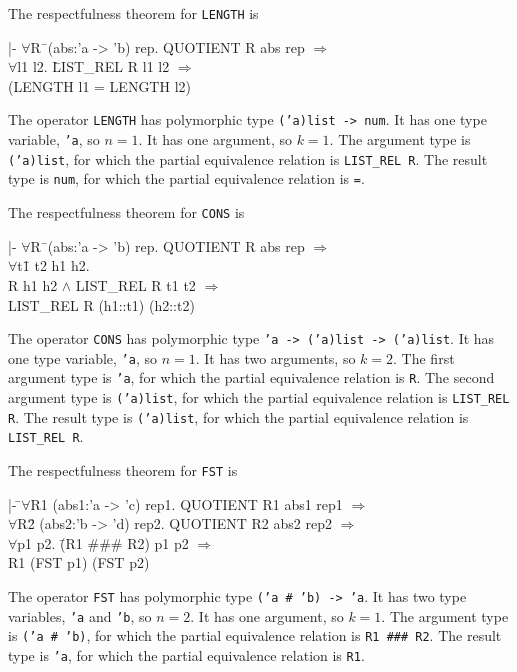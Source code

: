 \documentclass[envcountsame,runningheads]{llncs}
\newcommand{\quotient}{partial equivalence}
\begin{document}
\pagebreak[2]
The respectfulness theorem for {\tt LENGTH} is
{\tt \begin{tabbing}
\hspace{5.5mm}
    |- $\forall$R\=\ (abs:'a -> 'b) rep. QUOTIENT R abs rep $\Rightarrow$ \\
\>       $\forall$l1 l2. \=LIST\_REL R l1 l2 $\Rightarrow$ \\
\>\>             (LENGTH l1 = LENGTH l2)
\end{tabbing}}
The operator {\tt LENGTH} has polymorphic type {\tt ('a)list -> num}. 
It has one type variable, {\tt 'a}, so $n = 1$. 
It has one argument, so $k = 1$.
The argument type is
{\tt ('a)list},
for which
the \quotient{} relation
is {\tt LIST\_REL R}.
The result type is
{\tt num},
for which
the \quotient{} relation
is {\tt =}.

The respectfulness theorem for {\tt CONS} is
{\tt \begin{tabbing}
\hspace{5.5mm}
    |- $\forall$R\=\ (abs:'a -> 'b) rep. QUOTIENT R abs rep $\Rightarrow$ \\
\>       $\forall$t\=1 t2 h1 h2. \\
\>\>       R h1 h2 $\wedge$ LIST\_REL R t1 t2 $\Rightarrow$ \\
\>\>       LIST\_REL R (h1::t1) (h2::t2)
\end{tabbing}}
The operator {\tt CONS} has polymorphic type {\tt 'a -> ('a)list -> ('a)list}. 
It has one type variable, {\tt 'a}, so $n = 1$. 
It has two arguments, so $k = 2$.
The first argument type is
{\tt 'a},
for which
the \quotient{} relation
is {\tt R}.
The second argument type is
{\tt ('a)list},
for which
the \quotient{} relation
is {\tt LIST\_REL R}.
The result type is
{\tt ('a)list},
for which
the \quotient{} relation
is {\tt LIST\_REL R}.

The respectfulness theorem for {\tt FST} is
{\tt \begin{tabbing}
\hspace{5.5mm}
    |- \=$\forall$R1 (abs1:'a -> 'c) rep1. QUOTIENT R1 abs1 rep1 $\Rightarrow$ \\
\>     $\forall$R\=2 (abs2:'b -> 'd) rep2. QUOTIENT R2 abs2 rep2 $\Rightarrow$ \\
\>\>     $\forall$p1 p2. \=(R1 \#\#\# R2) p1 p2 $\Rightarrow$ \\
\>\>\>           R1 (FST p1) (FST p2)
\end{tabbing}}
The operator {\tt FST} has polymorphic type {\tt ('a \# 'b) -> 'a}. 
It has two type variables, {\tt 'a} and {\tt 'b}, so $n = 2$. 
It has one argument, so $k = 1$.
The argument type is
{\tt ('a \# 'b)},
for which
the \quotient{} relation
is {\tt R1 \#\#\# R2}.
The result type is
{\tt 'a},
for which
the \quotient{} relation
is {\tt R1}.
\end{document}
